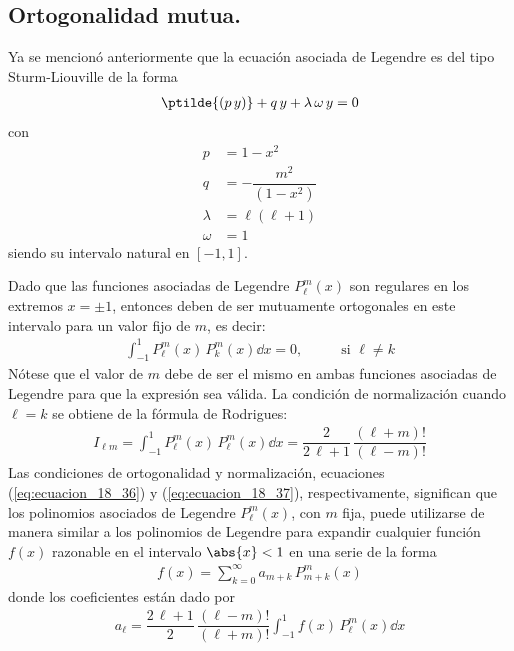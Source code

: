\subsection{Ortogonalidad mutua.}
Ya se mencionó anteriormente que la ecuación asociada de Legendre es del tipo Sturm-Liouville de la forma
\begin{align*}
\ptilde{(p \, y)} + q \, y + \lambda \,  \omega \, y = 0
\end{align*}
con
\begin{align*}
p &= 1 - x^{2} \\[0.5em]
q &= - \dfrac{m^{2}}{(1 - x^{2})} \\[0.5em]
\lambda &= \ell (\ell + 1) \\[0.5em]
\omega &= 1
\end{align*}
siendo su intervalo natural en $[-1,1]$.
\par
Dado que las funciones asociadas de Legendre $P_{\ell}^{m} (x)$ son regulares en los extremos $x = \pm 1$, entonces deben de ser mutuamente ortogonales en este intervalo para un valor fijo de $m$, es decir:
\begin{align}
\int_{-1}^{1} P_{\ell}^{m} (x) \, P_{k}^{m} (x) \dd{x}  = 0, \hspace{1cm} \mbox{ si } \ell \neq	 k
\label{eq:ecuacion_18_36}
\end{align}
Nótese que el valor de $m$ debe de ser el mismo en ambas funciones asociadas de Legendre para que la expresión sea válida. La condición de normalización cuando $\ell = k$ se obtiene de la fórmula de Rodrigues:
\begin{align}
I_{\ell m} = \int_{-1}^{1} P_{\ell}^{m} (x) \, P_{\ell}^{m} (x) \dd{x} = \dfrac{2}{2 \, \ell + 1} \, \dfrac{(\ell + m)!}{( \ell - m)!}
\label{eq:ecuacion_18_37}
\end{align}
Las condiciones de ortogonalidad y normalización, ecuaciones (\ref{eq:ecuacion_18_36}) y (\ref{eq:ecuacion_18_37}), respectivamente, significan que los polinomios asociados de Legendre $P_{\ell}^{m}(x)$, con $m$ fija, puede utilizarse de manera similar a los polinomios de Legendre para expandir cualquier función $f(x)$ razonable en el intervalo $\abs{x} < 1$ en una serie de la forma
\begin{align}
f(x) = \sum_{k=0}^{\infty} a_{m+k} \, P_{m+k}^{m} (x)
\label{eq:ecuacion_18_38}
\end{align}
donde los coeficientes están dado por
\begin{align*}
a_{\ell} = \dfrac{2 \, \ell + 1}{2} \, \dfrac{(\ell - m)!}{(\ell + m)!} \int_{-1}^{1} f(x) \, P_{\ell}^{m} (x) \dd{x}
\end{align*}

